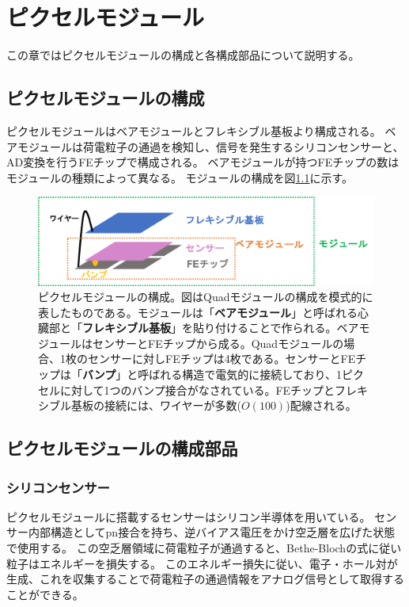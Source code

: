 \chapter{ピクセルモジュール}\label{chap:pmodule}
この章ではピクセルモジュールの構成と各構成部品について説明する。

\section{ピクセルモジュールの構成}
ピクセルモジュールはベアモジュールとフレキシブル基板より構成される。
ベアモジュールは荷電粒子の通過を検知し、信号を発生するシリコンセンサーと、AD変換を行うFEチップで構成される。
ベアモジュールが持つFEチップの数はモジュールの種類によって異なる。
モジュールの構成を図\ref{module_configuration}に示す。

\begin{figure}[bpt]\centering
\includegraphics[width=14cm]{./module_configuration.png}
\caption[ピクセルモジュールの構成]{ピクセルモジュールの構成。図はQuadモジュールの構成を模式的に表したものである。モジュールは「\textbf{ベアモジュール}」と呼ばれる心臓部と「\textbf{フレキシブル基板}」を貼り付けることで作られる。ベアモジュールはセンサーとFEチップから成る。Quadモジュールの場合、1枚のセンサーに対しFEチップは4枚である。センサーとFEチップは「\textbf{バンプ}」と呼ばれる構造で電気的に接続しており、1ピクセルに対して1つのバンプ接合がなされている。FEチップとフレキシブル基板の接続には、ワイヤーが多数($O(100)$)配線される。}
\label{module_configuration}
\end{figure}

\section{ピクセルモジュールの構成部品}
\subsection{シリコンセンサー}
ピクセルモジュールに搭載するセンサーはシリコン半導体を用いている。
センサー内部構造としてpn接合を持ち、逆バイアス電圧をかけ空乏層を広げた状態で使用する\cite{2-1}。
この空乏層領域に荷電粒子が通過すると、Bethe-Blochの式\cite{2-3}に従い粒子はエネルギーを損失する。
このエネルギー損失に従い、電子・ホール対が生成、これを収集することで荷電粒子の通過情報をアナログ信号として取得することができる。

